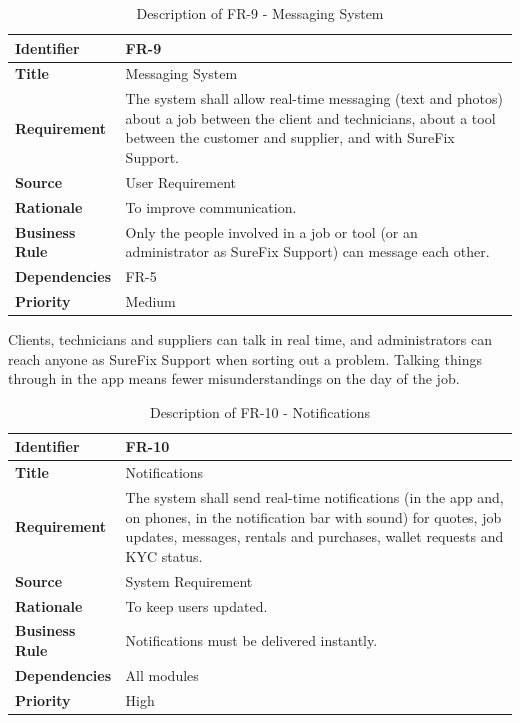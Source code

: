 \documentclass[A4paper,12pt]{report}
\theoremstyle{plain}
\theoremstyle{definition}
\theoremstyle{remark}
\numberwithin{equation}{section}
\begin{document}
\begin{table}[h!]
\centering
\caption{Description of FR-9 - Messaging System}
\begin{tabular}{|p{}|p{}|}
\hline
\textbf{Identifier} & FR-9 \\ \hline
\textbf{Title} & Messaging System \\ \hline
\textbf{Requirement} & The system shall allow real-time messaging (text and photos) about a job between the client and technicians, about a tool between the customer and supplier, and with SureFix Support. \\ \hline
\textbf{Source} & User Requirement \\ \hline
\textbf{Rationale} & To improve communication. \\ \hline
\textbf{Business Rule} & Only the people involved in a job or tool (or an administrator as SureFix Support) can message each other. \\ \hline
\textbf{Dependencies} & FR-5 \\ \hline
\textbf{Priority} & Medium \\ \hline
\end{tabular}
\end{table}

Clients, technicians and suppliers can talk in real time, and administrators can reach anyone as SureFix Support when sorting out a problem. Talking things through in the app means fewer misunderstandings on the day of the job.

\begin{table}[h!]
\centering
\caption{Description of FR-10 - Notifications}
\begin{tabular}{|p{}|p{}|}
\hline
\textbf{Identifier} & FR-10 \\ \hline
\textbf{Title} & Notifications \\ \hline
\textbf{Requirement} & The system shall send real-time notifications (in the app and, on phones, in the notification bar with sound) for quotes, job updates, messages, rentals and purchases, wallet requests and KYC status. \\ \hline
\textbf{Source} & System Requirement \\ \hline
\textbf{Rationale} & To keep users updated. \\ \hline
\textbf{Business Rule} & Notifications must be delivered instantly. \\ \hline
\textbf{Dependencies} & All modules \\ \hline
\textbf{Priority} & High \\ \hline
\end{tabular}
\end{table}
\end{document}
